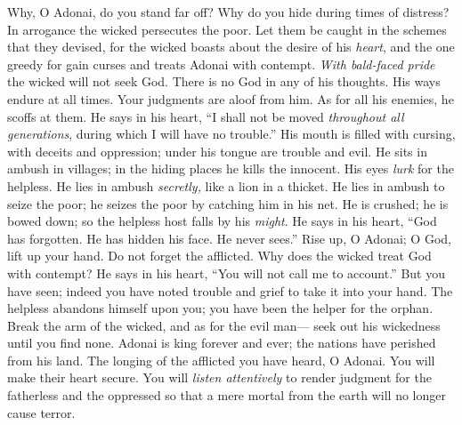 \begin{biblechapter} %
 Why, O Adonai, do you stand far off? 
Why do you hide during times of distress?
\verse In arrogance the wicked persecutes the poor. 
Let them be caught in the schemes that they devised,
\verse for the wicked boasts about the desire of his \textit{heart}, 
and the one greedy for gain curses and treats Adonai with contempt.
\verse \textit{With bald-faced pride} the wicked will not seek God. 
There is no God in any of his thoughts.
\verse His ways endure at all times. 
Your judgments are aloof from him. 
As for all his enemies, he scoffs at them.
\verse He says in his heart, “I shall not be moved 
\textit{throughout all generations}, during which I will have no trouble.”
\verse His mouth is filled with cursing, 
with deceits and oppression; 
under his tongue are trouble and evil.
\verse He sits in ambush in villages; 
in the hiding places he kills the innocent. 
His eyes \textit{lurk} for the helpless.
\verse He lies in ambush \textit{secretly,} like a lion in a thicket. 
He lies in ambush to seize the poor; 
he seizes the poor by catching him in his net.
\verse He is crushed; he is bowed down; 
so the helpless host falls by his \textit{might}.
\verse He says in his heart, “God has forgotten. 
He has hidden his face. 
He never sees.”
\verse Rise up, O Adonai; 
O God, lift up your hand. 
Do not forget the afflicted.
\verse Why does the wicked treat God with contempt? 
He says in his heart, “You will not call me to account.”
\verse But you have seen; indeed you have noted trouble and grief 
to take it into your hand. 
The helpless abandons himself upon you; 
you have been the helper for the orphan.
\verse Break the arm of the wicked, 
and as for the evil man— 
seek out his wickedness until you find none.
\verse Adonai is king forever and ever; 
the nations have perished from his land.
\verse The longing of the afflicted you have heard, O Adonai. 
You will make their heart secure. You will \textit{listen attentively}
\verse to render judgment for the fatherless and the oppressed 
so that a mere mortal from the earth will no longer cause terror.
\end{biblechapter}

